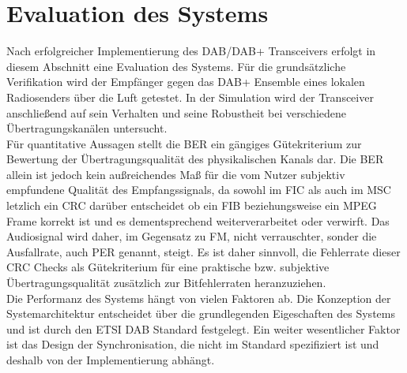 \chapter{Evaluation des Systems}
\label{sec:evaluation}
Nach erfolgreicher Implementierung des DAB/DAB+ Transceivers erfolgt in diesem Abschnitt eine Evaluation des Systems. Für die grundsätzliche Verifikation wird der Empfänger gegen das DAB+ Ensemble eines lokalen Radiosenders über die Luft getestet. In der Simulation wird der Transceiver anschließend auf sein Verhalten und seine Robustheit bei verschiedene Übertragungskanälen untersucht. \\
Für quantitative Aussagen stellt die \ac{BER} ein gängiges Gütekriterium zur Bewertung der Übertragungsqualität des physikalischen Kanals dar. Die \ac{BER} allein ist jedoch kein außreichendes Maß für die vom Nutzer subjektiv empfundene Qualität des Empfangssignals, da sowohl im FIC als auch im MSC letzlich ein CRC darüber entscheidet ob ein FIB beziehungsweise ein MPEG Frame korrekt ist und es dementsprechend weiterverarbeitet oder verwirft. Das Audiosignal wird daher, im Gegensatz zu FM, nicht verrauschter, sonder die Ausfallrate, auch \ac{PER} genannt, steigt. Es ist daher sinnvoll, die Fehlerrate dieser CRC Checks als Gütekriterium für eine praktische bzw. subjektive Übertragungsqualität zusätzlich zur Bitfehlerraten heranzuziehen.\\

Die Performanz des Systems hängt von vielen Faktoren ab. Die Konzeption der Systemarchitektur entscheidet über die grundlegenden Eigeschaften des Systems und ist durch den ETSI DAB Standard \cite{etsi:dab_main} festgelegt. Ein weiter wesentlicher Faktor ist das Design der Synchronisation, die nicht im Standard spezifiziert ist und deshalb von der Implementierung abhängt.

